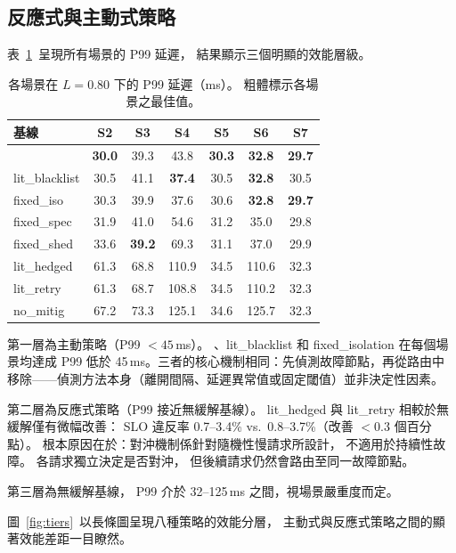 \subsection{反應式與主動式策略}
\label{sec:eval-lit}
\label{sec:eval-tiers}

表~\ref{tab:tiers}~呈現所有場景的 P99 延遲，
結果顯示三個明顯的效能層級。

\begin{table}[t]
\centering
\caption{各場景在 $L = 0.80$ 下的 P99 延遲（ms）。
  粗體標示各場景之最佳值。}
\label{tab:tiers}
\footnotesize
\begin{tabular}{@{}lcccccc@{}}
\toprule
基線 & S2 & S3 & S4 & S5 & S6 & S7 \\
\midrule
\system{} & \textbf{30.0} & 39.3 & 43.8 & \textbf{30.3} & \textbf{32.8} & \textbf{29.7} \\
lit\_blacklist & 30.5 & 41.1 & \textbf{37.4} & 30.5 & \textbf{32.8} & 30.5 \\
fixed\_iso & 30.3 & 39.9 & 37.6 & 30.6 & \textbf{32.8} & \textbf{29.7} \\
fixed\_spec & 31.9 & 41.0 & 54.6 & 31.2 & 35.0 & 29.8 \\
fixed\_shed & 33.6 & \textbf{39.2} & 69.3 & 31.1 & 37.0 & 29.9 \\
\midrule
lit\_hedged & 61.3 & 68.8 & 110.9 & 34.5 & 110.6 & 32.3 \\
lit\_retry & 61.3 & 68.7 & 108.8 & 34.5 & 110.2 & 32.3 \\
no\_mitig & 67.2 & 73.3 & 125.1 & 34.6 & 125.7 & 32.3 \\
\bottomrule
\end{tabular}
\end{table}

第一層為主動策略（P99 $< 45$\,ms）。
\system{}、lit\_blacklist 和 fixed\_isolation 在每個場景均達成
P99 低於 45\,ms。三者的核心機制相同：先偵測故障節點，再從路由中移除——偵測方法本身（離開間隔、延遲異常值或固定閾值）並非決定性因素。

第二層為反應式策略（P99 接近無緩解基線）。
lit\_hedged 與 lit\_retry 相較於無緩解僅有微幅改善：
SLO 違反率 0.7--3.4\% vs.\ 0.8--3.7\%（改善 $< 0.3$ 個百分點）。
根本原因在於：對沖機制係針對隨機性慢請求所設計，
不適用於持續性故障。
各請求獨立決定是否對沖，
但後續請求仍然會路由至同一故障節點。

第三層為無緩解基線，
P99 介於 32--125\,ms 之間，視場景嚴重度而定。

圖~\ref{fig:tiers}~以長條圖呈現八種策略的效能分層，
主動式與反應式策略之間的顯著效能差距一目瞭然。

